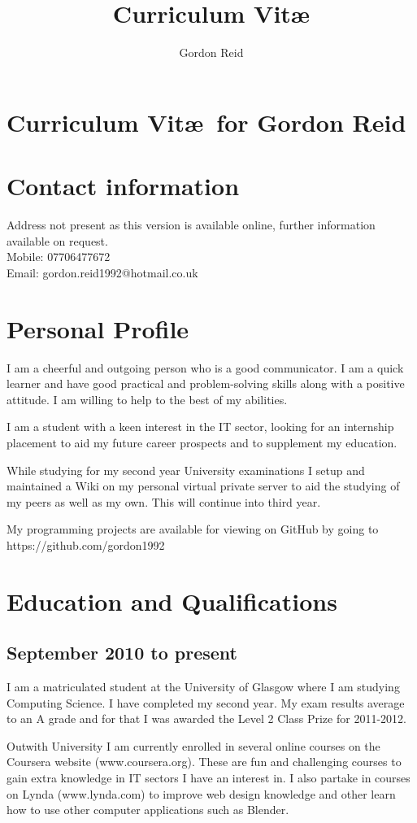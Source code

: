 \documentclass[10pt,a4paper]{article}
\title{Curriculum Vit\ae}
\author{Gordon Reid}
\begin{document}
\section*{Curriculum Vit\ae\ for Gordon Reid}
\section*{Contact information}
Address not present as this version is available online, further information 
available on request.\\
Mobile: 07706477672\\
Email: gordon.reid1992@hotmail.co.uk
\section*{Personal Profile}
I am a cheerful and outgoing person who is a good communicator. I am a quick 
learner and have good practical and problem-solving skills along with a 
positive attitude. I am willing to help to the best of my abilities.

I am a student with a keen interest in the IT sector, looking for an 
internship placement to aid my future career prospects and to supplement my 
education.

While studying for my second year University examinations I setup and 
maintained a Wiki on my personal virtual private server to aid the studying 
of my peers as well as my own. This will continue into third year.

My programming projects are available for viewing on GitHub by going to 
https://github.com/gordon1992
\section*{Education and Qualifications}
\subsection*{September 2010 to present}
I am a matriculated student at the University of Glasgow where I am studying 
Computing Science. I have completed my second year. My exam results average 
to an A grade and for that I was awarded the Level 2 Class Prize for 
2011-2012.

Outwith University I am currently enrolled in several online courses on the 
Coursera website (www.coursera.org). These are fun and challenging courses to 
gain extra knowledge in IT sectors I have an interest in. I also partake in 
courses on Lynda (www.lynda.com) to improve web design knowledge and other 
learn how to use other computer applications such as Blender.
\end{document}
